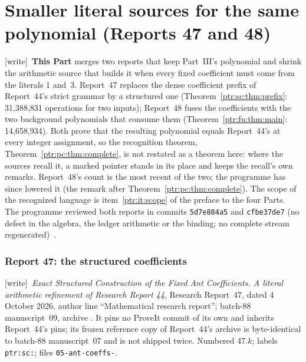 \documentclass[11pt,letterpaper]{article}
\makeatletter
\newcommand{\ptrhead}{Front matter}
\theoremstyle{definition}\newtheorem{definition}[theorem]{Definition}
\theoremstyle{remark}\newtheorem{remark}[theorem]{Remark}
\newcommand{\ptrR}{}
\newcommand{\ptrstart}[2]{%
  \renewcommand{\ptrR}{#1}\setcounter{section}{0}\setcounter{equation}{0}%
  \def\Hy@chapapp{section}%
  \renewcommand{\thesection}{#1.\arabic{section}}%
  \renewcommand{\theHsection}{#1.\arabic{section}}%
  \renewcommand{\theequation}{#1.\arabic{equation}}%
  \renewcommand{\theHequation}{#1.\arabic{equation}}%
  \renewcommand{\ptrhead}{#2}}
\newcommand{\wtag}{\textup{[write]}}
\makeatother
\begin{document}
\part{Smaller literal sources for the same polynomial (Reports 47 and 48)}\label{ptr:part:src}
\ptrstart{47}{Part IV: Report 47}
\label{ptr:sc:sec:intro}
\noindent\wtag\ \textbf{This Part} merges two reports that keep Part~III's
polynomial and shrink the arithmetic source that builds it when every fixed
coefficient must come from the literals 1 and~3. Report~47 replaces the
dense coefficient prefix of Report~44's strict grammar by a structured one
(Theorem~\ref{ptr:sc:thm:prefix}: 31,388,831 operations for two inputs);
Report~48 fuses the coefficients with the two background polynomials that
consume them (Theorem~\ref{ptr:fu:thm:main}: 14,658,934). Both prove that the
resulting polynomial equals Report~44's at every integer assignment, so the
recognition theorem, Theorem~\ref{ptr:pc:thm:complete}, is not restated as a
theorem here: where the sources recall it, a marked pointer stands in its
place and keeps the recall's own remarks. Report~48's count is the most
recent of the two; the programme has since lowered it (the remark after
Theorem~\ref{ptr:pc:thm:complete}). The scope of the recognized language is
item~\ref{ptr:it:scope} of the preface to the four Parts. The programme
reviewed both reports in commits \texttt{5d7e884a5} and \texttt{cfbe37de7}
(no defect in the algebra, the ledger arithmetic or the binding; no complete
stream regenerated)~\cite{ptr:w:rev4748,ptr:w:rev4048}.

\section*{Report 47: the structured coefficients}
\noindent\wtag\ \emph{Exact Structured Construction of the Fixed
Ant Coefficients. A literal arithmetic refinement of Research Report 44},
Research Report~47, dated 4 October 2026, author line ``Mathematical research
report''; batch-88 manuscript~09, archive
.
It pins no ProveIt commit of its own and inherits Report~44's pins; its
frozen reference copy of Report~44's archive is byte-identical to batch-88
manuscript~07 and is not shipped twice. Numbered 47.$k$; labels
\texttt{ptr:sc:}; files \texttt{05-ant-coeffs-}.
\end{document}

